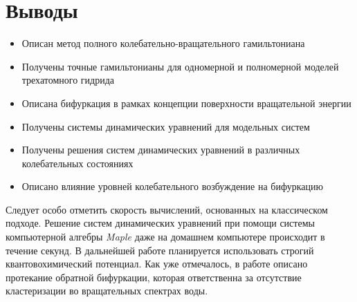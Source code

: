 \section{Выводы}

\begin{itemize}
\item Описан метод полного колебательно-вращательного гамильтониана
\item Получены точные гамильтонианы для одномерной и полномерной моделей трехатомного гидрида
\item Описана бифуркация в рамках концепции поверхности вращательной энергии
\item Получены системы динамических уравнений для модельных систем
\item Получены решения систем динамических уравнений в различных колебательных состояниях 
\item Описано влияние уровней колебательного возбуждение на бифуркацию
\end{itemize}

Следует особо отметить скорость вычислений, основанных на классическом подходе. Решение систем динамических уравнений при помощи системы компьютерной алгебры \textit{Maple} даже на домашнем компьютере происходит в течение секунд.
В дальнейшей работе планируется использовать строгий квантовохимический потенциал. Как уже отмечалось, в работе \cite{petrov2002} описано протекание обратной бифуркации, которая ответственна за отсутствие кластеризации во вращательных спектрах воды.  

